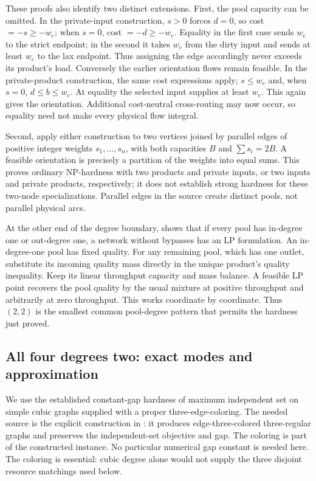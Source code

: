 These proofs also identify two distinct extensions. First, the pool
capacity can be omitted. In the private-input construction, $s>0$
forces $d=0$, so cost $=-s\ge-w_e$; when $s=0$, cost $=-d\ge-w_e$.
Equality in the first case sends $w_e$ to the strict endpoint; in the
second it takes $w_e$ from the dirty input and sends at least $w_e$ to
the lax endpoint. Thus assigning the edge accordingly never exceeds
its product's load. Conversely the earlier orientation flows remain
feasible. In the private-product construction, the same cost expressions
apply; $s\le w_e$ and, when $s=0$, $d\le b\le w_e$. At equality the
selected input supplies at least $w_e$. This again gives the orientation.
Additional cost-neutral cross-routing may now occur, so equality need
not make every physical flow integral.

Second, apply either construction to two vertices joined by parallel
edges of positive integer weights $s_1,\ldots,s_n$, with both capacities
$B$ and $\sum s_i=2B$. A feasible orientation is precisely a partition
of the weights into equal sums. This proves ordinary NP-hardness with
two products and private inputs, or two inputs and private products,
respectively; it does not establish strong hardness for these two-node
specializations. Parallel edges in the source create distinct pools,
not parallel physical arcs.

At the other end of the degree boundary,
\citet[Proposition~3]{haugland2016-the-computational-complexity-of-the}
shows that if every pool has in-degree one or out-degree one, a network
without bypasses has an LP formulation.
An in-degree-one pool has fixed quality. For any remaining pool, which
has one outlet, substitute its incoming quality mass directly in the
unique product's quality inequality. Keep its linear throughput capacity
and mass balance. A feasible LP point recovers the pool quality by the
usual mixture at positive throughput and arbitrarily at zero throughput.
This works coordinate by coordinate. Thus $(2,2)$ is the smallest common
pool-degree pattern that permits the hardness just proved.

\subsection{All four degrees two: exact modes and approximation}\label{s3:all-two}

We use the established constant-gap hardness of maximum independent set
on simple cubic graphs supplied with a proper three-edge-coloring.
The needed source is the explicit construction in
\citet[author manuscript, Section~5(A), pp.~25--26]{s3:chlebik2006}:
it produces edge-three-colored three-regular graphs and preserves the
independent-set objective and gap. The coloring is part of the constructed
instance. No particular numerical gap constant is needed here. The coloring is
essential: cubic degree alone would not supply the three disjoint
resource matchings used below.


